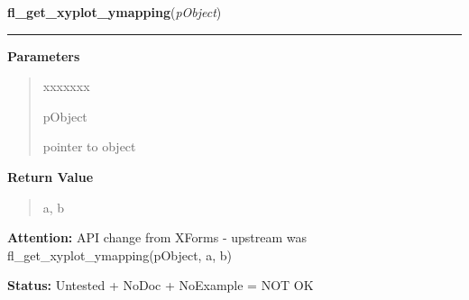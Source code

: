\hspace{.8\funcindent}\begin{boxedminipage}{\funcwidth}

    \raggedright \textbf{fl\_get\_xyplot\_ymapping}(\textit{pObject})

    \vspace{-1.5ex}

    \rule{\textwidth}{0.5\fboxrule}
\setlength{\parskip}{2ex}
\setlength{\parskip}{1ex}
      \textbf{Parameters}
      \vspace{-1ex}

      \begin{quote}
        \begin{Ventry}{xxxxxxx}

          \item[pObject]

          pointer to object

        \end{Ventry}

      \end{quote}

      \textbf{Return Value}
    \vspace{-1ex}

      \begin{quote}
      a, b

      \end{quote}

\textbf{Attention:} API change from XForms - upstream was fl\_get\_xyplot\_ymapping(pObject, a,
b)



\textbf{Status:} Untested + NoDoc + NoExample = NOT OK



    \end{boxedminipage}

    \label{xformslib:library:fl_set_xyplot_keys}

    \vspace{0.5ex}

